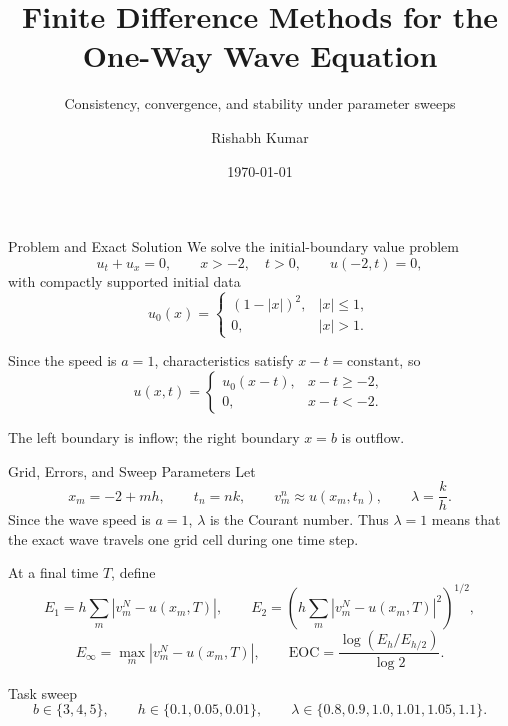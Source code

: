 \documentclass[aspectratio=169,10pt]{beamer}
\title[One-Way Wave Equation]{Finite Difference Methods for the One-Way Wave Equation}
\subtitle{Consistency, convergence, and stability under parameter sweeps}
\author{Rishabh Kumar}
\institute{MH7007 Topics in Scientific Computation I}
\date{\today}
\newcommand{\eoc}{\mathrm{EOC}}
\begin{document}
\begin{frame}
    \titlepage
\end{frame}

\begin{frame}{Problem and Exact Solution}
    We solve the initial-boundary value problem
    \begin{equation}
        u_t+u_x=0,\qquad x>-2,\quad t>0,\qquad u(-2,t)=0,
    \end{equation}
    with compactly supported initial data
    \begin{equation}
        u_0(x)=
        \begin{cases}
            (1-|x|)^2, & |x|\le 1,\\
            0, & |x|>1.
        \end{cases}
    \end{equation}

    Since the speed is $a=1$, characteristics satisfy $x-t=\mathrm{constant}$, so
    \begin{equation}
        u(x,t)=
        \begin{cases}
            u_0(x-t), & x-t\ge -2,\\
            0, & x-t<-2.
        \end{cases}
    \end{equation}

    The left boundary is inflow; the right boundary $x=b$ is outflow.
\end{frame}

\begin{frame}{Grid, Errors, and Sweep Parameters}
    Let
    \begin{equation}
        x_m=-2+mh,\qquad t_n=nk,\qquad
        v_m^n\approx u(x_m,t_n),\qquad \lambda=\frac{k}{h}.
    \end{equation}
    Since the wave speed is $a=1$, $\lambda$ is the Courant number.  Thus
    $\lambda=1$ means that the exact wave travels one grid cell during one time step.

    At a final time $T$, define
    \begin{equation}
        E_1=h\sum_m |v_m^N-u(x_m,T)|,\qquad
        E_2=\left(h\sum_m |v_m^N-u(x_m,T)|^2\right)^{1/2},
    \end{equation}
    \begin{equation}
        E_\infty=\max_m |v_m^N-u(x_m,T)|,\qquad
        \eoc=\frac{\log(E_h/E_{h/2})}{\log 2}.
    \end{equation}

    \begin{block}{Task sweep}
        \[
            b\in\{3,4,5\},\qquad
            h\in\{0.1,0.05,0.01\},\qquad
            \lambda\in\{0.8,0.9,1.0,1.01,1.05,1.1\}.
        \]
    \end{block}
\end{frame}
\end{document}
